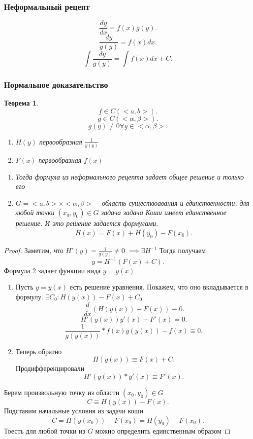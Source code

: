 \documentclass[14pt]{extarticle}
\newtheorem{theorem}{Теорема}
\begin{document}
\subsubsection{Неформальный рецепт}
\[
\frac{dy}{dx} = f(x)g(y)
.\] 
\[
\frac{dy}{g(y)} = f(x) dx
.\] 
\[
\int \frac{dy}{g(y)} = \int f(x) dx + C
.\] 
\subsubsection{Нормальное доказательство}
\begin{theorem}
    \[
    f \in C(<a,b>)
    .\] 
    \[
    g \in C(<\alpha,\beta>)
    .\] 
    \[
    g(y) \neq 0 \forall  y \in <\alpha,\beta>
    .\] 
    \begin{enumerate}
        \item $H(y) $ первообразная $\frac{1}{g(y)}$ 
        \item $F(x)$ первообразная  $f(x)$
    \end{enumerate}
    \begin{enumerate}
        \item Тогда формула из неформального рецепта задает общее решение  и только его
        \item $G = <a,b> \times <\alpha,\beta>$ -- область существоавания и единственности, для любой точки  $(x_0,y_0) \in G$ задача задача Коши имеет единственное решение.
            И это решение задается формулами.
            \[
            H(x) = F(x) + H(y_0) - F(x_0)
            .\] 
    \end{enumerate}
\end{theorem}
\begin{proof}
    Заметим, что  $H'(y) = \frac{1}{g(y)} \neq 0$ $\implies \exists  H^{-1}$ 
    Тогда получаем
    \[
    y = H^{-1} (F(x) + C)
    .\] 
    Формула 2 задает функции вида $y  = y(x)$
     \begin{enumerate}
        \item  Пусть $y = y(x)$ есть решение уравнения. Покажем, что оно вкладывается в формулу.  $\exists  C_0 : H(y(x)) - F(x) + C_0$
            \[
            \frac{d}{dx} (H(y(x)) - F(x)) \equiv 0
            .\] 
            \[
                H'(y(x)) y'(x) - F'(x) = 0
            .\] 
            \[
            \frac{1}{g(y(x))} * f(x) g(y(x)) - f(x) \equiv 0
            .\] 
        \item Теперь обратно
            \[
            H(y(x)) \equiv F(x) + C
            .\] 
            Продифференцировали
            \[
            H'(y(x)) * y'(x) \equiv F'(x)
            .\] 
    \end{enumerate}
    Берем произвольную точку из области $(x_0,y_0) \in G$
    \[
    C \equiv H(y(x)) - F(x)
    .\] 
    Подставим начальные условия из задачи коши
    \[
    C = H(y(x_0)) - F(x_0) = H(y_0) - F (x_0)
    .\] 
    Тоесть для любой точки из $G$ можно определить единственным образом
\end{proof}
\end{document}
